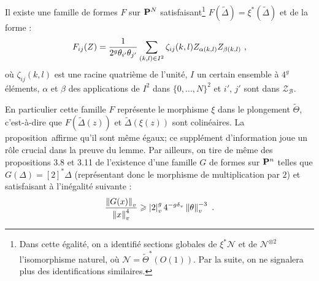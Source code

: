 \documentclass[11pt, twoside, a4paper]{article}
\theoremstyle{remark}
\begin{document}
\begin{fait}
 Il existe une famille de formes $F$ sur $\mathbf{P}^N$ satisfaisant\footnote{Dans cette égalité, on a identifié sections globales de $\xi^*\mathcal N$ et de $\mathcal N ^{\otimes 2}$  l'isomorphisme naturel, où $\mathcal N = \tilde\Theta^*(O(1))$. Par la suite, on ne signalera plus des identifications similaires.} $F(\tilde\Delta) = \xi^*(\tilde\Delta)$ et de la forme :
 \[
  F_{ij}(Z) = \frac 1{2^g \theta_{i'}\theta_{j'}}\sum_{(k,l)\in I^2} \zeta_{ij}(k, l) Z_{\alpha(k, l)} Z_{\beta(k, l)} \text{ ,}
 \]
 où $\zeta_{ij}(k, l)$ est une racine quatrième de l'unité, $I$ un certain ensemble à $4^g$ éléments, $\alpha$ et $\beta$ des applications de $I^2$ dans $\{0,\dots,N\}^2$ et $i'$, $j'$ sont dans $\mathcal Z_\mathcal B$.
\end{fait}

En particulier cette famille $F$ représente le morphisme $\xi$ dans le plongement $\tilde\Theta$, c'est-à-dire que $F(\tilde\Delta(z))$ et $\tilde\Delta(\xi(z))$ sont colinéaires. La proposition~affirme qu'il sont même égaux; ce supplément d'information joue un rôle crucial dans la preuve du lemme. Par ailleurs, on tire de même des propositions 3.8 et 3.11 de  l'existence d'une famille $G$ de formes sur $\mathbf{P}^n$ telles que $G(\Delta) = [2]^*\Delta$ (représentant donc le morphisme de multiplication par $2$) et satisfaisant à l'inégalité suivante :
\begin{equation} \label{NormDupl}
 \frac {\left\lVert G(x)\right\rVert_{v}}  {\left\lVert x\right\rVert_{v} ^4} \geqslant \left\lvert2\right\rvert_{v}^g 4^{-g{\delta\smash{_v}}} \left\lVert\theta\right\rVert_{v}^{-3} \text{ .}
\end{equation}
\end{document}
